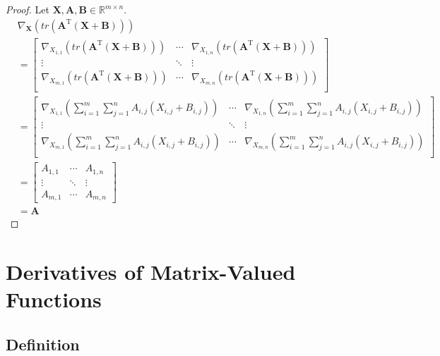 \documentclass{article}
\theoremstyle{plain}
\begin{document}
\begin{proof}
	Let
	\begin{math}
		\bm{X} , \bm{A} , \bm{B} \in \mathbb{R}^{m \times n} .
	\end{math}
	\begin{equation*}
		\begin{split}
			&\nabla_{\bm{X}} (tr(\bm{A}^{\mathrm{T}} (\bm{X} + \bm{B}))) \\
			&=
			\begin{bmatrix}
				\nabla_{X_{1,1}} (tr(\bm{A}^{\mathrm{T}} (\bm{X} + \bm{B}))) & \cdots & \nabla_{X_{1,n}} (tr(\bm{A}^{\mathrm{T}} (\bm{X} + \bm{B}))) \\
				\vdots & \ddots & \vdots \\
				\nabla_{X_{m,1}} (tr(\bm{A}^{\mathrm{T}} (\bm{X} + \bm{B}))) & \cdots & \nabla_{X_{m,n}} (tr(\bm{A}^{\mathrm{T}} (\bm{X} + \bm{B}))) \\
			\end{bmatrix} \\
			&=
			\begin{bmatrix}
				\nabla_{X_{1,1}} \left( \sum_{i=1}^m \sum_{j=1}^n A_{i,j} (X_{i,j} + B_{i,j}) \right) & \cdots & \nabla_{X_{1,n}} \left( \sum_{i=1}^m \sum_{j=1}^n A_{i,j} (X_{i,j} + B_{i,j}) \right) \\
				\vdots & \ddots & \vdots \\
				\nabla_{X_{m,1}} \left( \sum_{i=1}^m \sum_{j=1}^n A_{i,j} (X_{i,j} + B_{i,j}) \right) & \cdots & \nabla_{X_{m,n}} \left( \sum_{i=1}^m \sum_{j=1}^n A_{i,j} (X_{i,j} + B_{i,j}) \right) \\
			\end{bmatrix} \\
			&=
			\begin{bmatrix}
				A_{1,1} & \cdots & A_{1,n} \\
				\vdots & \ddots & \vdots \\
				A_{m,1} & \cdots & A_{m,n}
			\end{bmatrix} \\
			&= \bm{A}
		\end{split}
	\end{equation*}
\end{proof}


\section{Derivatives of Matrix-Valued Functions}


\subsection{Definition}
\end{document}
